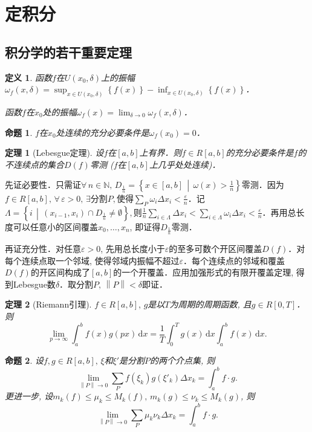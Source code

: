 \documentclass[11pt,a4paper]{ctexart}
\makeatletter
\theoremstyle{thmseries} %
\newtheorem{thm}{定理}[section]
\newtheorem{prop}{命题}[section]
\theoremstyle{exerseries}
\newtheorem{defn}{定义}[section]
\renewenvironment{proof}[1][\proofname]{\par
  \pushQED{\qed}%
  \normalfont \topsep6\p@\@plus6\p@\relax
  \trivlist
  \item[\hskip\labelsep
        \itshape
    #1\@addpunct{}]\ignorespaces
}{%
  \popQED\endtrivlist\@endpefalse
}
\newenvironment{pf}{\begin{proof}[\bfseries\upshape 证\quad]}{\end{proof}}
\newcommand{\cbra}[1]{\mathopen{}\left\{#1\right\}}
\renewcommand{\epsilon}{\varepsilon}
\newcommand{\N}{\mathbb{N}}
\renewcommand{\d}{\mathrm{d}}
\newcommand{\norm}[1]{\left\lVert#1\right\rVert}
\makeatother
\begin{document}
\section{定积分}
\subsection{积分学的若干重要定理}
\begin{defn}
	函数$f$在$U(x_0,\delta)$上的振幅$\omega_f(x,\delta)=\sup_{x\in U(x_0,\delta)}\cbra{f(x)}-\inf_{x\in U(x_0,\delta)}\cbra{f(x)}$．
	
	函数$f$在$x_0$处的振幅$\omega_f(x)=\lim_{\delta\to 0}\omega_f(x,\delta)$．
\end{defn}

\begin{prop}
	$f$在$x_0$处连续的充分必要条件是$\omega_f(x_0)=0$．
\end{prop}

\begin{thm}[Lebesgue定理]
	设$f$在$[a,b]$上有界．则$f\in R[a,b]$的充分必要条件是$f$的不连续点的集合$D(f)$零测 ($f$在$[a,b]$上几乎处处连续)．
\end{thm}
\begin{pf}
	先证必要性．只需证$\forall\,n\in\N,\,D_\frac{1}{n}=\cbra{x\in[a,b]\,\middle\vert\,\omega(x)>\frac{1}{n}}$零测．因为$f\in R[a,b],\,\forall\,\epsilon>0,\,\exists$分割$P,$使得$\sum_P\omega_i\Delta x_i<\frac{\epsilon}{n}$．记$\Lambda=\cbra{i\,\middle\vert\,(x_{i-1},x_i)\cap D_\frac{1}{n}\neq\emptyset},$则$\frac{1}{n}\sum_{i\in\Lambda}\Delta x_i<\sum_{i\in\Lambda}\omega_i\Delta x_i<\frac{\epsilon}{n}$．再用总长度可以任意小的区间覆盖$x_0,\dots,x_n$, 即证得$D_\frac{1}{n}$零测．

	再证充分性．对任意$\epsilon>0$, 先用总长度小于$\epsilon$的至多可数个开区间覆盖$D(f)$．对每个连续点取一个邻域, 使得邻域内振幅不超过$\epsilon$．每个连续点的邻域和覆盖$D(f)$的开区间构成了$[a,b]$的一个开覆盖．应用加强形式的有限开覆盖定理, 得到Lebesgue数$\delta$．取分割$P,\,\norm{P}<\delta$即证．
\end{pf}

\begin{thm}[Riemann引理]
	$f\in R[a,b],\,g$是以$T$为周期的周期函数, 且$g\in R[0,T]$．则
	\[\lim_{p\to\infty}\int_{a}^{b}f(x)g(px)\,\d x=\frac{1}{T}\int_{0}^{T}g(x)\,\d x\int_{a}^{b}f(x)\,\d x.\]
\end{thm}

\begin{prop}
	设$f,g\in R[a,b],\,\xi$和$\xi'$是分割$P$的两个介点集, 则
	\[\lim_{\norm{P}\to0}\sum_P f(\xi_k)g(\xi'_k)\Delta x_k=\int_{a}^{b}f\cdot g.\]
	更进一步, 设$m_k(f)\leq\mu_k\leq M_k(f),\,m_k(g)\leq\nu_k\leq M_k(g)$, 则
	\[\lim_{\norm{P}\to0}\sum_P \mu_k\nu_k\Delta x_k=\int_{a}^{b}f\cdot g.\]
\end{prop}
\end{document}
